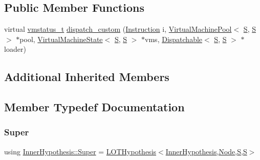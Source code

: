 \subsection*{Public Member Functions}
\begin{DoxyCompactItemize}
\item 
virtual \hyperlink{_instruction_8h_a6202215407ab29590bb936ca2996cf64}{vmstatus\+\_\+t} \hyperlink{class_inner_hypothesis_a9aea852725a3798aafeae5e7a5a0736b}{dispatch\+\_\+custom} (\hyperlink{class_instruction}{Instruction} i, \hyperlink{class_virtual_machine_pool}{Virtual\+Machine\+Pool}$<$ \hyperlink{_formal_language_theory-_complex_2_main_8cpp_a51c40915539205f0b5add30b0d68a4cb}{S}, \hyperlink{_formal_language_theory-_complex_2_main_8cpp_a51c40915539205f0b5add30b0d68a4cb}{S} $>$ $\ast$pool, \hyperlink{class_virtual_machine_state}{Virtual\+Machine\+State}$<$ \hyperlink{_formal_language_theory-_complex_2_main_8cpp_a51c40915539205f0b5add30b0d68a4cb}{S}, \hyperlink{_formal_language_theory-_complex_2_main_8cpp_a51c40915539205f0b5add30b0d68a4cb}{S} $>$ $\ast$vms, \hyperlink{class_dispatchable}{Dispatchable}$<$ \hyperlink{_formal_language_theory-_complex_2_main_8cpp_a51c40915539205f0b5add30b0d68a4cb}{S}, \hyperlink{_formal_language_theory-_complex_2_main_8cpp_a51c40915539205f0b5add30b0d68a4cb}{S} $>$ $\ast$loader)
\end{DoxyCompactItemize}
\subsection*{Additional Inherited Members}


\subsection{Member Typedef Documentation}
\mbox{\label{class_inner_hypothesis_a2c15665b923d905f1f7441282780abc2}} 
\subsubsection{\texorpdfstring{Super}{Super}}
{\footnotesize\ttfamily using \hyperlink{class_inner_hypothesis_a2c15665b923d905f1f7441282780abc2}{Inner\+Hypothesis\+::\+Super} =  \hyperlink{class_l_o_t_hypothesis}{L\+O\+T\+Hypothesis}$<$\hyperlink{class_inner_hypothesis}{Inner\+Hypothesis},\hyperlink{class_node}{Node},\hyperlink{_formal_language_theory-_complex_2_main_8cpp_a51c40915539205f0b5add30b0d68a4cb}{S},\hyperlink{_formal_language_theory-_complex_2_main_8cpp_a51c40915539205f0b5add30b0d68a4cb}{S}$>$}



